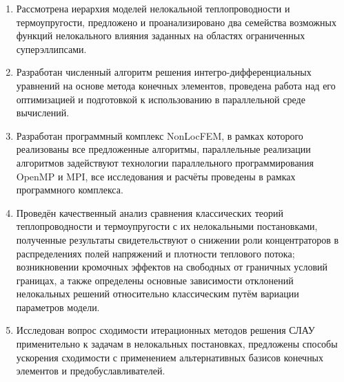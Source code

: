 \begin{enumerate}
	\item Рассмотрена иерархия моделей нелокальной теплопроводности и термоупругости, предложено и проанализировано два семейства возможных функций нелокального влияния заданных на областях ограниченных суперэллипсами.
	
	\item Разработан численный алгоритм решения интегро-дифференциальных уравнений на основе метода конечных элементов, проведена работа над его оптимизацией и подготовкой к использованию в параллельной среде вычислений.
	
	\item Разработан программный комплекс NonLocFEM, в рамках которого реализованы все предложенные алгоритмы, параллельные реализации алгоритмов задействуют технологии параллельного программирования OpenMP и MPI, все исследования и расчёты проведены в рамках программного комплекса.
	
	\item Проведён качественный анализ сравнения классических теорий теплопроводности и термоупругости с их нелокальными постановками, полученные результаты свидетельствуют о снижении роли концентраторов в распределениях полей напряжений и плотности теплового потока; возникновении кромочных эффектов на свободных от граничных условий границах, а также определены основные зависимости отклонений нелокальных решений относительно классическим путём вариации параметров модели.
	
	\item Исследован вопрос сходимости итерационных методов решения СЛАУ применительно к задачам в нелокальных постановках, предложены способы ускорения сходимости с применением альтернативных базисов конечных элементов и предобуславливателей.
\end{enumerate}
